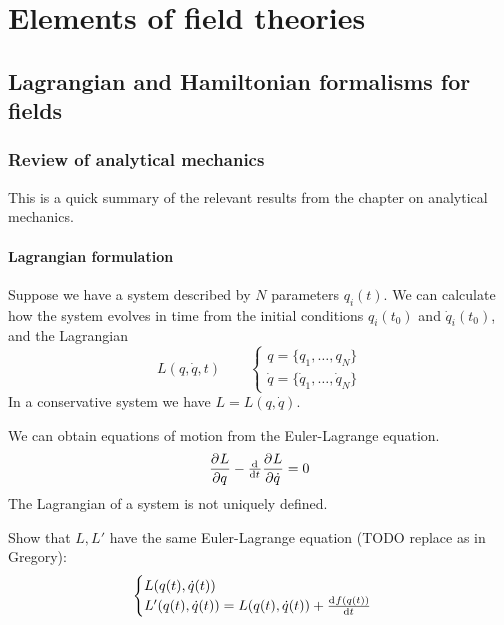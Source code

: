 \chapter{Elements of field theories}
\section{Lagrangian and Hamiltonian formalisms for fields}
\subsection{Review of analytical mechanics}
This is a quick summary of the relevant results from the chapter on analytical mechanics.

\subsubsection{Lagrangian formulation}

Suppose we have a system described by $N$ parameters $q_i(t)$. We can calculate how the system evolves in time from the initial conditions $q_i(t_0)$ and $\dot{q}_i(t_0)$, and the Lagrangian
\[ L(q, \dot{q}, t) \qquad \begin{cases}
q = \{ q_1, \ldots , q_N\} \\
\dot{q} = \{ \dot{q}_1, \ldots , \dot{q}_N\}
\end{cases} \]
In a conservative system we have $L = L(q, \dot{q})$.

We can obtain equations of motion from the Euler-Lagrange equation.
\[ \pd{L}{q}- \od{}{t} \pd{L}{\dot{q}} = 0 \]
The Lagrangian of a system is not uniquely defined.

\begin{example}
Show that $L,L'$ have the same Euler-Lagrange equation (TODO replace as in Gregory):
\[ \begin{cases}
L(q(t), \dot{q}(t)) \\
L'(q(t), \dot{q}(t)) = L(q(t), \dot{q}(t))+ \od{f(q(t))}{t}
\end{cases} \]
\end{example}

